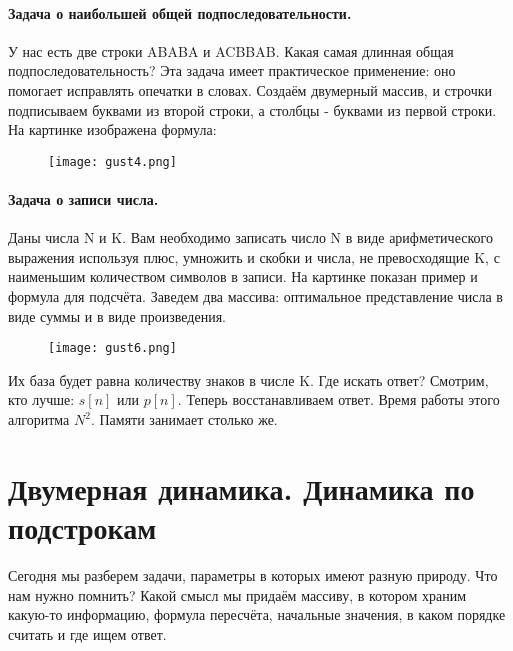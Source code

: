 \documentclass[a4paper,12pt]{article}
\begin{document}
\paragraph{Задача о наибольшей общей подпоследовательности.}
У нас есть две строки ABABA и ACBBAB. Какая самая длинная общая подпоследовательность? Эта задача имеет практическое применение: оно помогает исправлять опечатки в словах. Создаём двумерный массив, и строчки подписываем буквами из второй строки, а столбцы - буквами из первой строки. На картинке изображена формула:
\begin{figure}[h]
\centering
\texttt{[image: gust4.png]}
\end{figure}
\paragraph{Задача о записи числа.}
Даны числа N и K. Вам необходимо записать число N в виде арифметического выражения используя плюс, умножить и скобки и числа, не превосходящие K, с наименьшим количеством символов в записи. На картинке показан пример и формула для подсчёта. Заведем два массива: оптимальное представление числа в виде суммы и в виде произведения.
\begin{figure}[h]
\centering
\texttt{[image: gust6.png]}
\end{figure}
Их база будет равна количеству знаков в числе K. Где искать ответ? Смотрим, кто лучше: $s[n]$ или $p[n]$. Теперь восстанавливаем ответ. Время работы этого алгоритма $N^2$. Памяти занимает столько же.
\newpage
\section{Двумерная динамика. Динамика по подстрокам}
Сегодня мы разберем задачи, параметры в которых имеют разную природу. Что нам нужно помнить? Какой смысл мы придаём массиву, в котором храним какую-то информацию, формула пересчёта, начальные значения, в каком порядке считать и где ищем ответ. 
\end{document}
